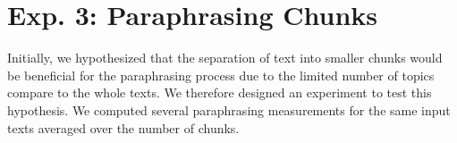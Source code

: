 \section{Exp. 3: Paraphrasing Chunks}
\label{sec:results_chunks}

Initially, we hypothesized that the separation of text into smaller chunks would be beneficial for the paraphrasing process due to the limited number of topics compare to the whole texts.
We therefore designed an experiment to test this hypothesis.
We computed several paraphrasing measurements for the same input texts averaged over the number of chunks.


\begin{table}[]
\centering
\caption{Impact of the number of chunks on syntactic and semantic paraphrase measures.
Impact is measured in absolute changes between the measure for one chunk and the maximum number of chunks.
There is no great effect on one-step approaches or on the \dataGutenberg{}.
Bold values denote the extremest changes.
Syntactic measures should be small while semantic values should be positive.}
\label{tab:impact_chunks_dataset_paraphraser}
\end{table}


